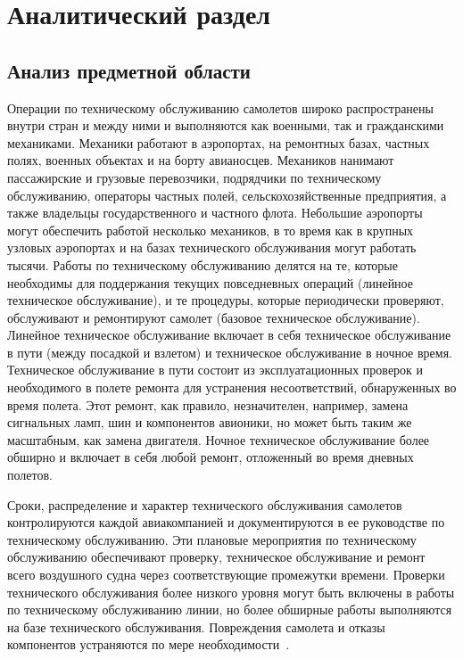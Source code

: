 \chapter{Аналитический раздел}


\section{Анализ предметной области}


Операции по техническому обслуживанию самолетов широко распространены внутри стран и между ними и выполняются как военными, так и гражданскими механиками.
Механики работают в аэропортах, на ремонтных базах, частных полях, военных объектах и на борту авианосцев.
Механиков нанимают пассажирские и грузовые перевозчики, подрядчики по техническому обслуживанию, операторы частных полей, сельскохозяйственные предприятия, а также владельцы государственного и частного флота.
Небольшие аэропорты могут обеспечить работой несколько механиков, в то время как в крупных узловых аэропортах и на базах технического обслуживания могут работать тысячи.
Работы по техническому обслуживанию делятся на те, которые необходимы для поддержания текущих повседневных операций (линейное техническое обслуживание), и те процедуры, которые периодически проверяют, обслуживают и ремонтируют самолет (базовое техническое обслуживание).
Линейное техническое обслуживание включает в себя техническое обслуживание в пути (между посадкой и взлетом) и техническое обслуживание в ночное время.
Техническое обслуживание в пути состоит из эксплуатационных проверок и необходимого в полете ремонта для устранения несоответствий, обнаруженных во время полета.
Этот ремонт, как правило, незначителен, например, замена сигнальных ламп, шин и компонентов авионики, но может быть таким же масштабным, как замена двигателя.
Ночное техническое обслуживание более обширно и включает в себя любой ремонт, отложенный во время дневных полетов.

Сроки, распределение и характер технического обслуживания самолетов контролируются каждой авиакомпанией и документируются в ее руководстве по техническому обслуживанию.
Эти плановые мероприятия по техническому обслуживанию обеспечивают проверку, техническое обслуживание и ремонт всего воздушного судна через соответствующие промежутки времени.
Проверки технического обслуживания более низкого уровня могут быть включены в работы по техническому обслуживанию линии, но более обширные работы выполняются на базе технического обслуживания.
Повреждения самолета и отказы компонентов устраняются по мере необходимости~\cite{otplane}.

